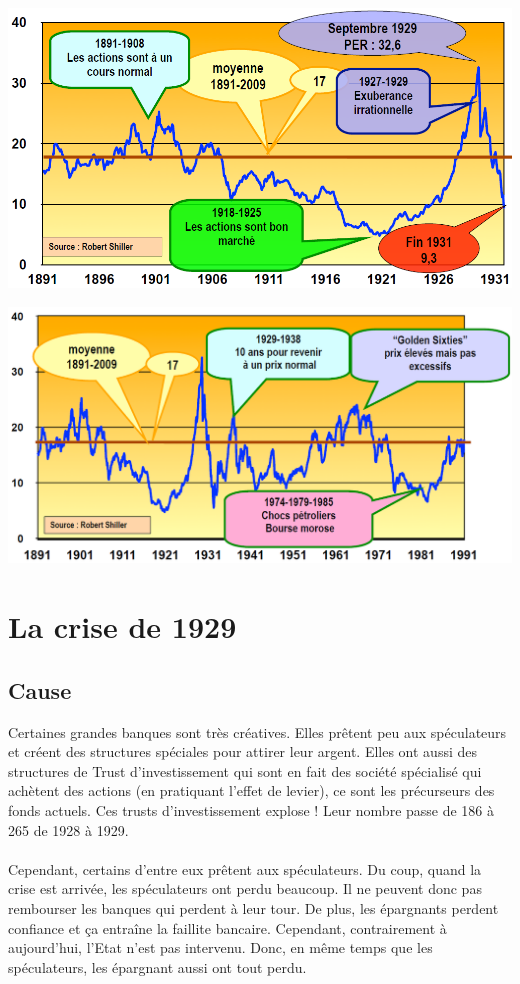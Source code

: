 \begin{minipage}{0.5\textwidth}
	\begin{flushleft}
		\includegraphics[scale=0.3]{47}
	\end{flushleft}
\end{minipage}
\begin{minipage}{0.5\textwidth}
	\begin{center}
		\includegraphics[scale=0.3]{48}
	\end{center}
\end{minipage}

\section{La crise de 1929}

\subsection{Cause}
Certaines grandes banques sont très créatives. Elles prêtent peu aux spéculateurs et créent des structures spéciales pour attirer leur argent. Elles ont aussi des structures de Trust d'investissement qui sont en fait des société spécialisé qui achètent des actions (en pratiquant l'effet de levier), ce sont les précurseurs des fonds actuels. Ces trusts d'investissement explose ! Leur nombre passe de 186 à 265 de 1928 à 1929.
\\\\
Cependant, certains d'entre eux prêtent aux spéculateurs. Du coup, quand la crise est arrivée, les spéculateurs ont perdu beaucoup. Il ne peuvent donc pas rembourser les banques qui perdent à leur tour. De plus, les épargnants perdent confiance et ça entraîne la faillite bancaire. Cependant, contrairement à aujourd'hui, l'Etat n'est pas intervenu. Donc, en même temps que les spéculateurs, les épargnant aussi ont tout perdu.

